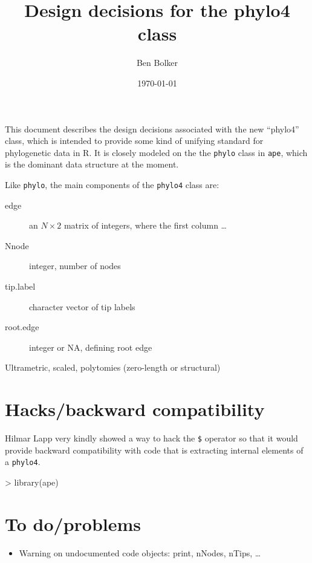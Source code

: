 \documentclass{article}
\title{Design decisions for the phylo4 class}
\author{Ben Bolker}
\date{\today}
\newcommand{\code}[1]{{{\tt #1}}}
\begin{document}
\maketitle

This document describes the design decisions associated
with the new ``phylo4'' class, which is intended to
provide some kind of unifying standard for phylogenetic
data in R.  It is closely modeled on the the \code{phylo}
class in \code{ape}, which is the dominant data structure
at the moment.

Like \code{phylo}, the main components of
the \code{phylo4} class are:
\begin{description}
\item[edge]{an $N \times 2$ matrix of integers,
  where the first column \ldots}
\item[Nnode]{integer, number of nodes}
\item[tip.label]{character vector of tip labels}
\item[root.edge]{integer or NA, defining root edge}
\end{description}

Ultrametric, scaled, polytomies (zero-length or structural)
 
\section{Hacks/backward compatibility}

Hilmar Lapp very kindly showed a way to hack
the \verb+$+ operator so that it would provide
backward compatibility with code that is 
extracting internal elements of a \code{phylo4}.


\begin{Schunk}
\begin{Sinput}
> library(ape)
\end{Sinput}
\end{Schunk}
\section{To do/problems}


\begin{itemize}
\item Warning on undocumented code objects: print, nNodes, nTips, \ldots
\end{itemize}
\end{document}
